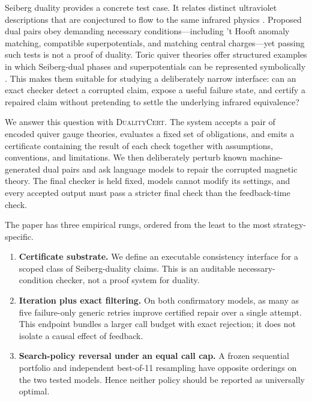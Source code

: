 \documentclass[11pt]{scrartcl}
\newcommand{\toolname}{\textsc{DualityCert}}
\begin{document}
Seiberg duality provides a concrete test case.  It relates distinct ultraviolet
descriptions that are conjectured to flow to the same infrared physics
\cite{Seiberg:1994pq,Intriligator:1995au}.  Proposed dual pairs obey demanding
necessary conditions---including 't Hooft anomaly matching, compatible
superpotentials, and matching central charges---yet passing such tests is not a
proof of duality.  Toric quiver theories offer structured examples in which
Seiberg-dual phases and superpotentials can be represented symbolically
\cite{Feng:2001bn}.  This makes them suitable for studying a deliberately
narrow interface: can an exact checker detect a corrupted claim, expose a
useful failure state, and certify a repaired claim without pretending to settle
the underlying infrared equivalence?

We answer this question with \toolname.  The system accepts a pair of encoded
quiver gauge theories, evaluates a fixed set of obligations, and emits a
certificate containing the result of each check together with assumptions,
conventions, and limitations.  We then deliberately perturb known
machine-generated dual pairs and ask language models to repair the corrupted
magnetic theory.  The final checker is held fixed, models cannot modify its
settings, and every accepted output must pass a stricter final check than the
feedback-time check.

The paper has three empirical rungs, ordered from the least to the most
strategy-specific.

\begin{enumerate}[leftmargin=2.1em,itemsep=0.25em]
  \item \textbf{Certificate substrate.}  We define an executable consistency
  interface for a scoped class of Seiberg-duality claims.  This is an auditable
  necessary-condition checker, not a proof system for duality.
  \item \textbf{Iteration plus exact filtering.}  On both confirmatory models,
  as many as five failure-only generic retries improve certified repair over a single
  attempt.  This endpoint bundles a larger call budget with exact rejection;
  it does not isolate a causal effect of feedback.
  \item \textbf{Search-policy reversal under an equal call cap.}  A frozen
  sequential portfolio and independent best-of-11 resampling have opposite
  orderings on the two tested models.  Hence neither policy should be reported
  as universally optimal.
\end{enumerate}
\end{document}
